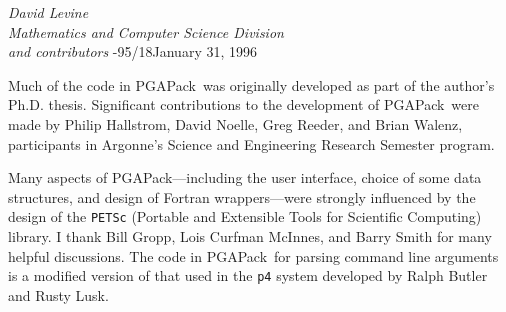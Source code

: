 \documentclass{report}
\newcommand{\pga}{PGAPack}
\begin{document}
{\em David Levine\\[.1in]
Mathematics and Computer Science Division\\[.1in]
and contributors
}{-95/18}{January 31, 1996}



\date{\today}

\newpage


Much of the code in \pga\ was originally developed as part of the author's
Ph.D. thesis.  Significant contributions to the development of
\pga\ were made by Philip Hallstrom, David Noelle, Greg Reeder, and Brian
Walenz, participants in Argonne's Science and Engineering Research Semester
program.

Many aspects of \pga---including the user interface, choice of some data
structures, and design of Fortran wrappers---were strongly influenced by the
design of the {\tt PETSc} (Portable and Extensible Tools for Scientific
Computing) library.
I thank Bill Gropp, Lois Curfman McInnes, and Barry Smith
for many helpful discussions.  The code in \pga\ for parsing command line
arguments is a modified version of that used in the {\tt p4} system
developed by Ralph Butler and  Rusty Lusk.

\newpage

% 
% 
% 
% 
% 
\end{document}
